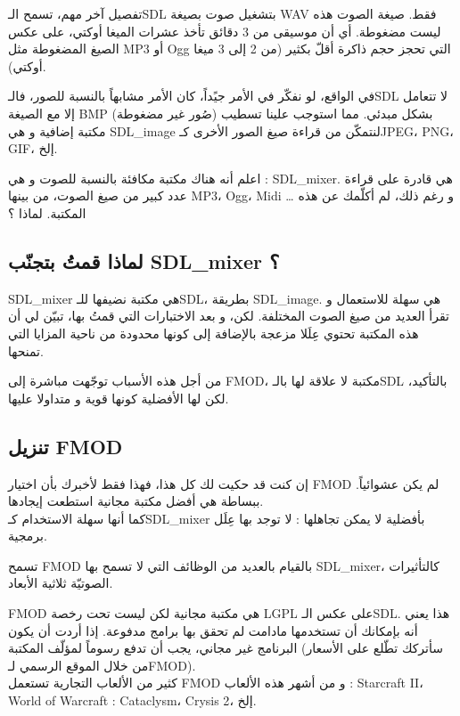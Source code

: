 تفصيل آخر مهم، تسمح الـ\textenglish{SDL}
بتشغيل صوت بصيغة
\textenglish{WAV}
فقط. صيغة الصوت هذه ليست مضغوطة. أي أن موسيقى من 3 دقائق تأخذ عشرات الميغا أوكتي،
على عكس الصيغ المضغوطة مثل
\textenglish{MP3}
أو
\textenglish{Ogg}
التي تحجز حجم ذاكرة أقلّ بكثير (من 2 إلى 3 ميغا أوكتي).

في الواقع، لو نفكّر في الأمر جيًداً، كان الأمر مشابهاً بالنسبة للصور، فالـ\textenglish{SDL}
لا تتعامل إلا مع الصيغة
\textenglish{BMP}
(صُور غير مضغوطة) بشكل مبدئي. مما استوجب علينا تسطيب مكتبة إضافية و هي
\textenglish{SDL\_image}
لنتمكّن من قراءة صيغ الصور الأخرى كـ\textenglish{JPEG}، \textenglish{PNG}، \textenglish{GIF}،
إلخ.

اعلم أنه هناك مكتبة مكافئة بالنسبة للصوت و هي :
\textenglish{SDL\_mixer}.
هي قادرة على قراءة عدد كبير من صيغ الصوت، من بينها
\textenglish{MP3}، \textenglish{Ogg}، \textenglish{Midi} \dots
و رغم ذلك، لم أكلّمك عن هذه المكتبة. لماذا ؟

\subsection{لماذا قمتُ بتجنّب \textenglish{SDL\_mixer} ؟}

\textenglish{SDL\_mixer}
هي مكتبة نضيفها للـ\textenglish{SDL}،
بطريقة 
\textenglish{SDL\_image}.
هي سهلة للاستعمال و تقرأ العديد من صيغ الصوت المختلفة. لكن، و بعد الاختبارات التي قمتُ بها، تبيّن لي أن هذه المكتبة تحتوي عِلَلا مزعجة بالإضافة إلى كونها محدودة من ناحية المزايا التي تمنحها.

من أجل هذه الأسباب توجّهت مباشرة إلى
\textenglish{FMOD}،
مكتبة لا علاقة لها بالـ\textenglish{SDL}
بالتأكيد، لكن لها الأفضلية كونها قوية و متداولا عليها.

\subsection{تنزيل \textenglish{FMOD}}

إن كنت قد حكيت لك كل هذا، فهذا فقط لأخبرك بأن اختيار
\textenglish{FMOD}
لم يكن عشوائياً. ببساطة هي أفضل مكتبة مجانية استطعت إيجادها.\\
كما أنها سهلة الاستخدام كـ\textenglish{SDL\_mixer}
بأفضلية لا يمكن تجاهلها : لا توجد بها عِلَل برمجية.

تسمح
\textenglish{FMOD}
بالقيام بالعديد من الوظائف التي لا تسمح بها
\textenglish{SDL\_mixer}،
كالتأثيرات الصوتيّة ثلاثية الأبعاد.

\begin{warning}
\textenglish{FMOD}
هي مكتبة مجانية لكن ليست تحت رخصة
\textenglish{LGPL}
على عكس الـ\textenglish{SDL}.
هذا يعني أنه بإمكانك أن تستخدمها مادامت لم تحقق بها برامج مدفوعة. إذا أردت أن يكون البرنامج غير مجاني، يجب أن تدفع رسوماً لمؤلّف المكتبة (سأتركك تطّلع على الأسعار من خلال الموقع الرسمي لـ\textenglish{FMOD}).\\
كثير من الألعاب التجارية تستعمل
\textenglish{FMOD}
و من أشهر هذه الألعاب :
\textenglish{Starcraft II}، \textenglish{World of Warcraft : Cataclysm}، \textenglish{Crysis 2}،
إلخ.
\end{warning}

